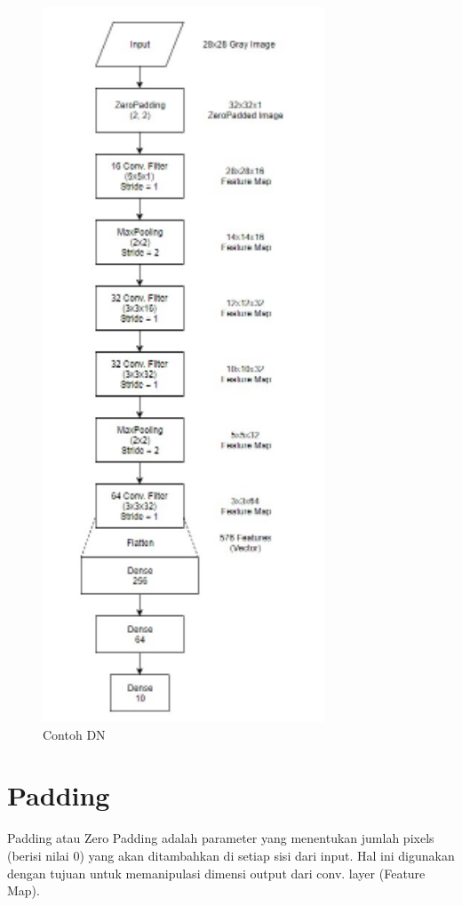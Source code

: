 \begin{figure}[!htp]
	\includegraphics[width=0.75\textwidth]{figures/DeeperNetwork.PNG}
	\caption{Contoh DN}
	\label{labelgambar5}
\end{figure}


\section{Padding}
Padding atau Zero Padding adalah parameter yang menentukan jumlah pixels (berisi nilai 0) yang akan ditambahkan di setiap sisi dari input. Hal ini digunakan dengan tujuan untuk memanipulasi dimensi output dari conv. layer (Feature Map).

